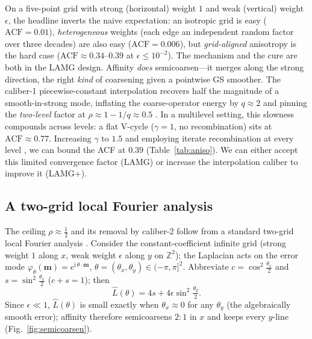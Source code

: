\documentclass[leqno,letterpaper]{etna}
\newcommand{\acf}{\mathrm{ACF}}
\begin{document}
On a five-point grid with strong (horizontal) weight $1$ and weak (vertical) weight $\epsilon$,
the headline inverts the naive expectation: an isotropic grid is easy ($\acf=0.01$),
\emph{heterogeneous} weights (each edge an independent random factor over three decades) are
also easy ($\acf=0.006$), but \emph{grid-aligned} anisotropy is the hard case
($\acf\approx0.34$--$0.39$ at $\epsilon\le10^{-2}$). The mechanism and the cure are both in the
LAMG design. Affinity \emph{does} semicoarsen---it merges along the strong direction, the right
\emph{kind} of coarsening given a pointwise GS smoother. The caliber-1 piecewise-constant interpolation recovers half the magnitude of a
smooth-in-strong mode, inflating the coarse-operator energy by $q\approx2$ and pinning the
\emph{two-level} factor at $\rho\approx1-1/q\approx0.5$ \cite[\S3.4.3]{lamg}. In a multilevel setting, this slowness compounds across levels: a flat V-cycle ($\gamma=1$, no recombination) sits at $\acf\approx0.77$. Increasing $\gamma$ to $1.5$ and employing iterate recombination at every level \cite[\S3.4.5]{lamg}, we can bound the ACF at $0.39$ (Table~\ref{tab:aniso}). We can either accept this limited convergence factor (LAMG) or increase the interpolation caliber to improve it (LAMG+).

\subsection{A two-grid local Fourier analysis}\label{sec:lfa}
The ceiling $\rho\approx\tfrac12$ and its removal by
caliber-2 follow from a standard two-grid local Fourier analysis \cite[\S4.1]{guide}. Consider the
constant-coefficient infinite grid (strong weight $1$ along $x$, weak weight $\epsilon$ along $y$ on
$\mathbb Z^2$); the Laplacian acts on the error mode
$\varphi_\theta(\mathbf m)=e^{\mathrm{i}\,\theta\cdot\mathbf m}$,
$\theta=(\theta_x,\theta_y)\in(-\pi,\pi]^2$. Abbreviate $c=\cos^2\tfrac{\theta_x}{2}$ and
$s=\sin^2\tfrac{\theta_x}{2}$ ($c{+}s=1$); then
\begin{equation}\label{eq:Lsymbol}
\hat L(\theta)=4s+4\epsilon\sin^2\tfrac{\theta_y}{2}.
\end{equation}
Since $\epsilon\ll1$, $\hat L(\theta)$ is small exactly when $\theta_x\approx0$ for any $\theta_y$ (the
algebraically smooth error); affinity therefore semicoarsens $2{:}1$ in $x$ and keeps every $y$-line
(Fig.~\ref{fig:semicoarsen}).
\end{document}
